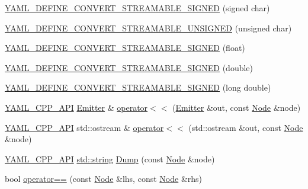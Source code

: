 \begin{DoxyCompactItemize}
\item 
\mbox{\hyperlink{namespace_y_a_m_l_a988ca78e757b17476ac3b02b04d83e3b}{Y\+A\+M\+L\+\_\+\+D\+E\+F\+I\+N\+E\+\_\+\+C\+O\+N\+V\+E\+R\+T\+\_\+\+S\+T\+R\+E\+A\+M\+A\+B\+L\+E\+\_\+\+S\+I\+G\+N\+ED}} (signed char)
\item 
\mbox{\hyperlink{namespace_y_a_m_l_ab1074b275dd770115a9976e4e421ba09}{Y\+A\+M\+L\+\_\+\+D\+E\+F\+I\+N\+E\+\_\+\+C\+O\+N\+V\+E\+R\+T\+\_\+\+S\+T\+R\+E\+A\+M\+A\+B\+L\+E\+\_\+\+U\+N\+S\+I\+G\+N\+ED}} (unsigned char)
\item 
\mbox{\hyperlink{namespace_y_a_m_l_a0c5f93e7570dd08ce0c59640316e179b}{Y\+A\+M\+L\+\_\+\+D\+E\+F\+I\+N\+E\+\_\+\+C\+O\+N\+V\+E\+R\+T\+\_\+\+S\+T\+R\+E\+A\+M\+A\+B\+L\+E\+\_\+\+S\+I\+G\+N\+ED}} (float)
\item 
\mbox{\hyperlink{namespace_y_a_m_l_a014a313ea6c602c58917f833ed68e94b}{Y\+A\+M\+L\+\_\+\+D\+E\+F\+I\+N\+E\+\_\+\+C\+O\+N\+V\+E\+R\+T\+\_\+\+S\+T\+R\+E\+A\+M\+A\+B\+L\+E\+\_\+\+S\+I\+G\+N\+ED}} (double)
\item 
\mbox{\hyperlink{namespace_y_a_m_l_aa1acc378fbd32c1f6f3511cbd3f2c6b5}{Y\+A\+M\+L\+\_\+\+D\+E\+F\+I\+N\+E\+\_\+\+C\+O\+N\+V\+E\+R\+T\+\_\+\+S\+T\+R\+E\+A\+M\+A\+B\+L\+E\+\_\+\+S\+I\+G\+N\+ED}} (long double)
\item 
\mbox{\hyperlink{dll_8h_a70903db05b58f40db9aa4f966658fa65}{Y\+A\+M\+L\+\_\+\+C\+P\+P\+\_\+\+A\+PI}} \mbox{\hyperlink{class_y_a_m_l_1_1_emitter}{Emitter}} \& \mbox{\hyperlink{namespace_y_a_m_l_afb2b66c89c934e94fe887b2ed52aae4f}{operator$<$$<$}} (\mbox{\hyperlink{class_y_a_m_l_1_1_emitter}{Emitter}} \&out, const \mbox{\hyperlink{class_y_a_m_l_1_1_node}{Node}} \&node)
\item 
\mbox{\hyperlink{dll_8h_a70903db05b58f40db9aa4f966658fa65}{Y\+A\+M\+L\+\_\+\+C\+P\+P\+\_\+\+A\+PI}} std\+::ostream \& \mbox{\hyperlink{namespace_y_a_m_l_a909957d407397c8d5b761db30ebcfe93}{operator$<$$<$}} (std\+::ostream \&out, const \mbox{\hyperlink{class_y_a_m_l_1_1_node}{Node}} \&node)
\item 
\mbox{\hyperlink{dll_8h_a70903db05b58f40db9aa4f966658fa65}{Y\+A\+M\+L\+\_\+\+C\+P\+P\+\_\+\+A\+PI}} \mbox{\hyperlink{glad_8h_ac83513893df92266f79a515488701770}{std\+::string}} \mbox{\hyperlink{namespace_y_a_m_l_a0d9a7de301ca30dfadbc7fca2460f623}{Dump}} (const \mbox{\hyperlink{class_y_a_m_l_1_1_node}{Node}} \&node)
\item 
bool \mbox{\hyperlink{namespace_y_a_m_l_a7c052a4506f887447de58aa58f6eb8fb}{operator==}} (const \mbox{\hyperlink{class_y_a_m_l_1_1_node}{Node}} \&lhs, const \mbox{\hyperlink{class_y_a_m_l_1_1_node}{Node}} \&rhs)

\end{DoxyCompactItemize}
